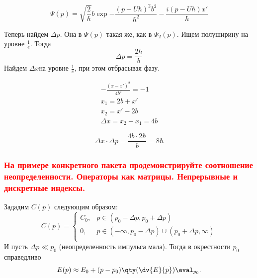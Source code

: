 \begin{equation}
	\Psi(p)=\sqrt{\frac{2}{\hbar}}b\exp{-\frac{(p-U\hbar)^2b^2}{\hbar^2}-\frac{i(p-U\hbar)x'}{\hbar} }
\end{equation}

Теперь найдем $\Delta p$. Она в $\Psi(p)$ такая же, как в $\Psi_2(p)$. Ищем полуширину на уровне $\frac{1}{e}$. Тогда
$$\Delta p=\frac{2\hbar}{b}$$
Найдем $\Delta x$на уровне $\frac1e$, при этом отбрасывая фазу.

\begin{gather*}
	-\frac{(x-x')^2}{4b^2}=-1 \\
	x_1=2b+x'\\
	x_2=x'-2b\\
	\Delta x= x_2-x_1=4b
\end{gather*}

$$\Delta x\cdot \Delta p=\frac{4b\cdot2\hbar}{b}=8\hbar  $$

\subsubsection{\textcolor{red} {На примере конкретного пакета продемонстрируйте соотношение неопределенности. Операторы как матрицы. Непрерывные и дискретные индексы.} }

Зададим $C(p)$ следующим образом:
\begin{equation}
	C(p)=
	\begin{cases}
		C_0, & p \in (p_0- \Delta p, p_0+ \Delta p) \\
		0,   & p \in (-\infty, p_0- \Delta p)\cup(p_0+ \Delta p,\infty) \\
	\end{cases}
\end{equation}
И пусть $ \Delta p \ll p_0 $ (неопределенность импульса мала). Тогда в окрестности $p_0 $ справедливо
$$E(p)\approx  E_0+(p-p_0) \qty(\dv{E}{p})\eval_{p_0}.$$

